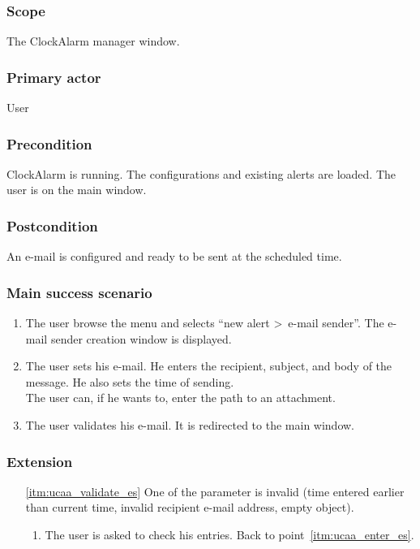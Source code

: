 \subsubsection{Scope}
The ClockAlarm manager window.
\subsubsection{Primary actor}
User
\subsubsection{Precondition}
ClockAlarm is running. The configurations and existing alerts are loaded. The user is on the main window.
\subsubsection{Postcondition}
An e-mail is configured and ready to be sent at the scheduled time.
\subsubsection{Main success scenario}
\begin{enumerate}
    \item The user browse the menu and selects ``new alert \textgreater~e-mail sender''. The e-mail sender creation window is displayed. 
	\item\label{itm:ucaa_enter_es} The user sets his e-mail. He enters the recipient, subject, and body of the message. He also sets the time of sending. \\The user can, if he wants to, enter the path to an attachment.
	\item\label{itm:ucaa_validate_es} The user validates his e-mail. It is redirected to the main window.
\end{enumerate}
\subsubsection{Extension}
\begin{enumerate}
	\item[\ref{itm:ucaa_validate_es}] One of the parameter is invalid (time entered earlier than current time, invalid recipient e-mail address, empty object).
	\begin{enumerate}[i]
		\item The user is asked to check his entries. Back to point~\ref{itm:ucaa_enter_es}.
	\end{enumerate}
\end{enumerate}
